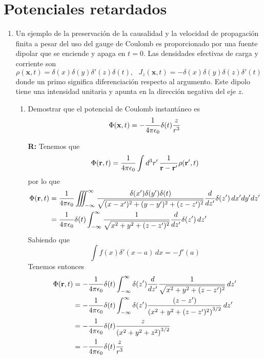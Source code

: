\documentclass[]{article}
\numberwithin{equation}{section}
\newcommand{\0}{\textcolor{gray}{0}}
\newcommand{\rv}{\mathbf{r}}
\newcommand{\xv}{\mathbf{x}}
\newcommand{\rdif}{\rv - \rv'}
\newcommand{\td}[2]{\dfrac{d #1}{d #2}}
\begin{document}
\section{Potenciales retardados}
\begin{enumerate}
	\item Un ejemplo de la preservación de la causalidad y la velocidad de propagación finita a pesar del uso del gauge de Coulomb es proporcionado por una fuente dipolar que se enciende y apaga en \(t = 0\). Las densidades efectivas de carga y corriente son
	\begin{equation*}
		\rho(\xv,t) = \delta(x)\delta(y)\delta'(z)\delta(t), ~~~ J_z(\xv,t) = -\delta(x)\delta(y)\delta(z)\delta'(t)
	\end{equation*}
	donde un primo significa diferenciación respecto al argumento. Este dipolo tiene una intensidad unitaria y apunta en la dirección negativa del eje \(z\).
	\begin{enumerate}
		\item Demostrar que el potencial de Coulomb instantáneo es
		\begin{equation*}
			\Phi (\xv,t) = -\ke \delta(t) \frac{z}{r^3}
		\end{equation*}
		
		\textbf{R:} Tenemos que
		\begin{equation*}
			\Phi(\rv,t) = \ke \int d^3r' \, \frac{1}{\rdif} \rho (\rv',t)
		\end{equation*}
		por lo que
		\begin{align*}
			\Phi(\rv,t) &= \ke \iiint_{-\infty}^{\infty}  \frac{\delta(x')\delta(y')\delta(t)}{\sqrt{(x - x')^2 + (y - y')^2 + (z - z')^2}} \td{}{z'}\delta(z') \, dx'dy'dz'\\
			&= \ke\delta(t) \int_{-\infty}^{\infty}  \frac{1}{\sqrt{x^2 + y^2 + (z - z')^2}} \td{}{z'}\delta(z') \, dz'
		\end{align*}
		Sabiendo que
		\begin{equation*}
			\int f(x) \delta'(x-a) \, dx = - f'(a)
		\end{equation*}
		Tenemos entonces
		\begin{align*}
			\Phi(\rv,t) &= -\ke\delta(t) \int_{-\infty}^{\infty}  \delta(z') \td{}{z'}\frac{1}{\sqrt{x^2 + y^2 + (z - z')^2}} \, dz'\\
			&= -\ke\delta(t) \int_{-\infty}^{\infty}  \delta(z') \frac{(z - z')}{\left(x^2 + y^2 + (z - z')^2\right)^{3/2}} \, dz'\\
			&= -\ke\delta(t)\frac{z}{\left(x^2 + y^2 + z^2\right)^{3/2}}\\
			&= -\ke\delta(t)\frac{z}{r^3}
		\end{align*}
		

\end{enumerate}
\end{enumerate}
\end{document}
